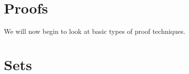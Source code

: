\newpage

\section{Proofs}

We will now begin to look at basic types of proof techniques. 

\newpage

\section{Sets}

